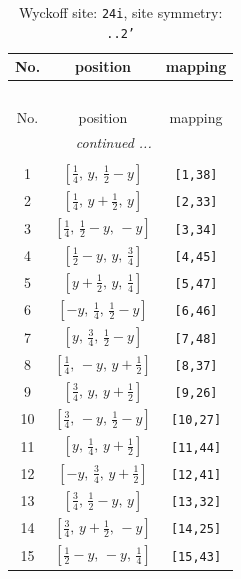 \documentclass[fleqn,8pt]{jsarticle}
\begin{document}
\begin{longtable}{ccc}
\caption{Wyckoff site: {\tt 24i}, site symmetry: {\tt ..2'}}
 \\
 \hline \hline
No. & position & mapping \\ \hline \endfirsthead

\multicolumn{2}{l}{\tablename\ \thetable{}} \\
 \hline \hline
No. & position & mapping \\ \hline \endhead

 \hline \hline
\multicolumn{2}{r}{\footnotesize\it continued ...} \\ \endfoot

 \hline \hline
\multicolumn{2}{r}{} \\ \endlastfoot

1 & $\left[ \frac{1}{4},\, y,\, \frac{1}{2} - y \right]$ & {\tt [1,38]} \\ \hline
2 & $\left[ \frac{1}{4},\, y + \frac{1}{2},\, y \right]$ & {\tt [2,33]} \\ \hline
3 & $\left[ \frac{1}{4},\, \frac{1}{2} - y,\, - y \right]$ & {\tt [3,34]} \\ \hline
4 & $\left[ \frac{1}{2} - y,\, y,\, \frac{3}{4} \right]$ & {\tt [4,45]} \\ \hline
5 & $\left[ y + \frac{1}{2},\, y,\, \frac{1}{4} \right]$ & {\tt [5,47]} \\ \hline
6 & $\left[ - y,\, \frac{1}{4},\, \frac{1}{2} - y \right]$ & {\tt [6,46]} \\ \hline
7 & $\left[ y,\, \frac{3}{4},\, \frac{1}{2} - y \right]$ & {\tt [7,48]} \\ \hline
8 & $\left[ \frac{1}{4},\, - y,\, y + \frac{1}{2} \right]$ & {\tt [8,37]} \\ \hline
9 & $\left[ \frac{3}{4},\, y,\, y + \frac{1}{2} \right]$ & {\tt [9,26]} \\ \hline
10 & $\left[ \frac{3}{4},\, - y,\, \frac{1}{2} - y \right]$ & {\tt [10,27]} \\ \hline
11 & $\left[ y,\, \frac{1}{4},\, y + \frac{1}{2} \right]$ & {\tt [11,44]} \\ \hline
12 & $\left[ - y,\, \frac{3}{4},\, y + \frac{1}{2} \right]$ & {\tt [12,41]} \\ \hline
13 & $\left[ \frac{3}{4},\, \frac{1}{2} - y,\, y \right]$ & {\tt [13,32]} \\ \hline
14 & $\left[ \frac{3}{4},\, y + \frac{1}{2},\, - y \right]$ & {\tt [14,25]} \\ \hline
15 & $\left[ \frac{1}{2} - y,\, - y,\, \frac{1}{4} \right]$ & {\tt [15,43]} \\ \hline

\end{longtable}
\end{document}
